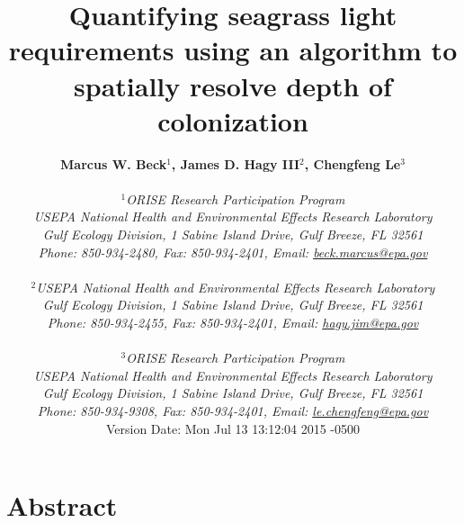 \documentclass[letterpaper,12pt,oneside]{article}\usepackage[]{graphicx}\usepackage[]{color}
\begin{document}
\raggedbottom
\linenumbers
\raggedright
{}
\setlength{\parindent}{0.5in}
\renewcommand\refname{References \vspace{12pt}}

\begin{singlespace}
\title{{\bf {\Large Quantifying seagrass light requirements using an algorithm to spatially resolve depth of colonization}}}
\author{
  {\bf {\normalsize Marcus W. Beck$^1$, James D. Hagy III$^2$, Chengfeng Le$^3$}}
  \\\\{\textit {\normalsize $^1$ORISE Research Participation Program}}
  \\{\textit {\normalsize USEPA National Health and Environmental Effects Research Laboratory}}
  \\{\textit {\normalsize Gulf Ecology Division, 1 Sabine Island Drive, Gulf Breeze, FL 32561}}
	\\{\textit {\normalsize Phone: 850-934-2480, Fax: 850-934-2401, Email: \href{mailto:beck.marcus@epa.gov}{beck.marcus@epa.gov}}}
  \\\\{\textit {\normalsize $^2$USEPA National Health and Environmental Effects Research Laboratory}}
	\\{\textit {\normalsize Gulf Ecology Division, 1 Sabine Island Drive, Gulf Breeze, FL 32561}}
	\\{\textit {\normalsize Phone: 850-934-2455, Fax: 850-934-2401, Email: \href{mailto:hagy.jim@epa.gov}{hagy.jim@epa.gov}}}
  \\\\{\textit {\normalsize $^3$ORISE Research Participation Program}}
  \\{\textit {\normalsize USEPA National Health and Environmental Effects Research Laboratory}}
  \\{\textit {\normalsize Gulf Ecology Division, 1 Sabine Island Drive, Gulf Breeze, FL 32561}}
  \\{\textit {\normalsize Phone: 850-934-9308, Fax: 850-934-2401, Email: \href{mailto:le.chengfeng@epa.gov}{le.chengfeng@epa.gov}}}
  \vspace{1in} 
  \\ Version Date:   Mon Jul 13 13:12:04 2015 -0500
	}
\date{}
\maketitle
\end{singlespace}
\clearpage

\section*{Abstract}
\end{document}
